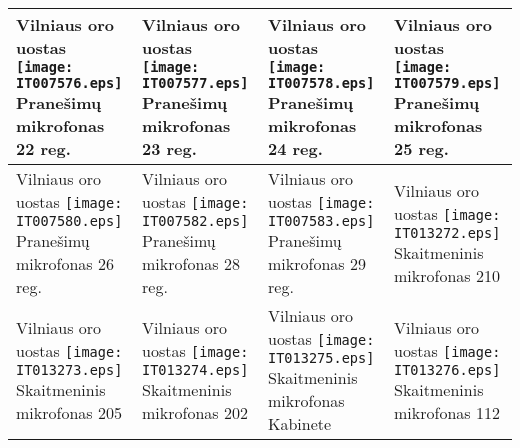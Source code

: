 \documentclass[a4paper,12pt]{article}
\begin{document}
\begin{supertabular}{|p{4.2cm}|p{4.2cm}|p{4.2cm}|p{4.2cm}|}
Vilniaus oro uostas \newline \texttt{[image: IT007576.eps]} \newline Pranešimų mikrofonas \newline \footnotesize {22 reg.} & Vilniaus oro uostas \newline \texttt{[image: IT007577.eps]} \newline Pranešimų mikrofonas \newline \footnotesize {23 reg.} & Vilniaus oro uostas \newline \texttt{[image: IT007578.eps]} \newline Pranešimų mikrofonas \newline \footnotesize {24 reg.} & Vilniaus oro uostas \newline \texttt{[image: IT007579.eps]} \newline Pranešimų mikrofonas \newline \footnotesize {25 reg.}\\\hline
Vilniaus oro uostas \newline \texttt{[image: IT007580.eps]} \newline Pranešimų mikrofonas \newline \footnotesize {26 reg.} & Vilniaus oro uostas \newline \texttt{[image: IT007582.eps]} \newline Pranešimų mikrofonas \newline \footnotesize {28 reg.} & Vilniaus oro uostas \newline \texttt{[image: IT007583.eps]} \newline Pranešimų mikrofonas \newline \footnotesize {29 reg.} & Vilniaus oro uostas \newline \texttt{[image: IT013272.eps]} \newline Skaitmeninis mikrofonas \newline \footnotesize {210}\\\hline
Vilniaus oro uostas \newline \texttt{[image: IT013273.eps]} \newline Skaitmeninis mikrofonas \newline \footnotesize {205} & Vilniaus oro uostas \newline \texttt{[image: IT013274.eps]} \newline Skaitmeninis mikrofonas \newline \footnotesize {202} & Vilniaus oro uostas \newline \texttt{[image: IT013275.eps]} \newline Skaitmeninis mikrofonas \newline \footnotesize {Kabinete} & Vilniaus oro uostas \newline \texttt{[image: IT013276.eps]} \newline Skaitmeninis mikrofonas \newline \footnotesize {112}\\\hline

\end{supertabular}
\end{document}
